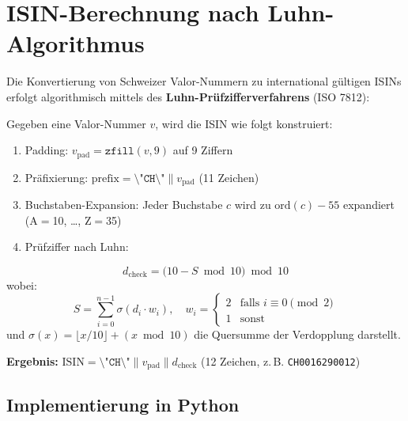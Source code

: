 \documentclass[12pt, a4paper, oneside]{report}
\begin{document}
\section{ISIN-Berechnung nach Luhn-Algorithmus}

Die Konvertierung von Schweizer Valor-Nummern zu international g\"ultigen ISINs erfolgt algorithmisch mittels des \textbf{Luhn-Pr\"ufzifferverfahrens} (ISO 7812):

\begin{mathbox}
Gegeben eine Valor-Nummer $v$, wird die ISIN wie folgt konstruiert:
\begin{enumerate}
  \item Padding: $v_{\text{pad}} = \texttt{zfill}(v, 9)$ auf 9 Ziffern
  \item Pr\"afixierung: $\text{prefix} = \texttt{\char`\"CH\char`\"} \| v_{\text{pad}}$ (11 Zeichen)
  \item Buchstaben-Expansion: Jeder Buchstabe $c$ wird zu $\text{ord}(c) - 55$ expandiert (A$=$10, \ldots, Z$=$35)
  \item Pr\"ufziffer nach Luhn:
\end{enumerate}
\[
  d_{\text{check}} = \bigl(10 - S \bmod 10\bigr) \bmod 10
\]
wobei:
\[
  S = \sum_{i=0}^{n-1} \sigma\!\left(d_i \cdot w_i\right), \quad w_i = \begin{cases} 2 & \text{falls } i \equiv 0 \pmod{2} \\ 1 & \text{sonst} \end{cases}
\]
und $\sigma(x) = \lfloor x/10 \rfloor + (x \bmod 10)$ die Quersumme der Verdopplung darstellt.

\textbf{Ergebnis:} $\text{ISIN} = \texttt{\char`\"CH\char`\"} \| v_{\text{pad}} \| d_{\text{check}}$ (12 Zeichen, z.\,B. \texttt{CH0016290012})
\end{mathbox}

\subsection{Implementierung in Python}
\end{document}
